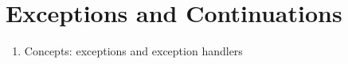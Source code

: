 \section{Exceptions and Continuations}\label{sec:Exceptions_Continuations}

\begin{enumerate}[noitemsep]
\item Concepts: exceptions and exception handlers
\end{enumerate}

